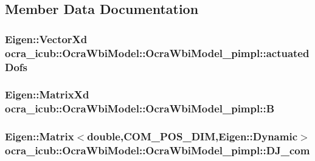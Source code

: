 \subsection{\-Member \-Data \-Documentation}
\hypertarget{structOcraWbiModel_1_1OcraWbiModel__pimpl_aca1e7991e3aa3941dfb08b58b4f8e82c}{
\subsubsection[{actuated\-Dofs}]{\setlength{\rightskip}{0pt plus 5cm}\-Eigen\-::\-Vector\-Xd {\bf ocra\-\_\-icub\-::\-Ocra\-Wbi\-Model\-::\-Ocra\-Wbi\-Model\-\_\-pimpl\-::actuated\-Dofs}}}\label{structOcraWbiModel_1_1OcraWbiModel__pimpl_aca1e7991e3aa3941dfb08b58b4f8e82c}
\hypertarget{structOcraWbiModel_1_1OcraWbiModel__pimpl_a71a78aa74a5b1422df339991ea6c6974}{
\subsubsection[{\-B}]{\setlength{\rightskip}{0pt plus 5cm}\-Eigen\-::\-Matrix\-Xd {\bf ocra\-\_\-icub\-::\-Ocra\-Wbi\-Model\-::\-Ocra\-Wbi\-Model\-\_\-pimpl\-::\-B}}}\label{structOcraWbiModel_1_1OcraWbiModel__pimpl_a71a78aa74a5b1422df339991ea6c6974}
\hypertarget{structOcraWbiModel_1_1OcraWbiModel__pimpl_a38a8628ca93524e08beada55f455249b}{
\subsubsection[{\-D\-J\-\_\-com}]{\setlength{\rightskip}{0pt plus 5cm}\-Eigen\-::\-Matrix$<$double,{\bf \-C\-O\-M\-\_\-\-P\-O\-S\-\_\-\-D\-I\-M},\-Eigen\-::\-Dynamic$>$ {\bf ocra\-\_\-icub\-::\-Ocra\-Wbi\-Model\-::\-Ocra\-Wbi\-Model\-\_\-pimpl\-::\-D\-J\-\_\-com}}}\label{structOcraWbiModel_1_1OcraWbiModel__pimpl_a38a8628ca93524e08beada55f455249b}
